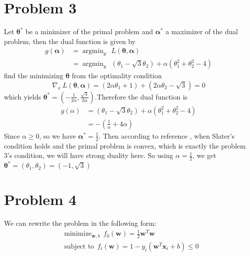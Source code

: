 \documentclass{article}
\begin{document}
\section*{Problem 3}
Let $\bm{\theta}^*$ be a minimizer of the primal problem and $\bm{\alpha}^*$ a maximizer of the dual problem, then the dual function is given by
\begin{equation}
	\begin{aligned}
		g(\bm{\alpha})
		&= \mathop{\arg\min}_{\theta}\ \ L(\bm{\theta}, \bm{\alpha})\\
		&= \mathop{\arg\min}_{\theta}\ \ (\theta_1 - \sqrt{3}\theta_2) + \alpha(\theta_1^2+\theta_2^2-4)	
	\end{aligned}
\end{equation}
find the minimizing $\bm{\theta}$ from the optimality condition
\begin{equation}
	\nabla_x\ L(\bm{\theta}, \bm{\alpha}) = (2\alpha\theta_1+1) + (2\alpha\theta_2 - \sqrt{3}) = 0
\end{equation}
which yields  $\bm{\theta}^*=(-\frac{1}{2\alpha}, \frac{\sqrt{3}}{2\alpha})$.Therefore the dual function is
\begin{equation}
	\begin{aligned}
		g(\alpha)
		&= (\theta_1 - \sqrt{3}\theta_2) + \alpha(\theta_1^2+\theta_2^2-4)\\
		&= -(\frac{1}{\alpha} + 4\alpha)
	\end{aligned}
\end{equation}
Since $\alpha \geq 0$, so we have $\bm{\alpha}^* = \frac{1}{2}$. Then according to reference \cite{Boyd:2004:CO:993483}, when Slater's condition holds and the primal problem is convex, which is exactly the problem 3's condition, we will have strong duality here. So using $\alpha = \frac{1}{2}$, we get $\bm{\theta}^* = (\theta_1, \theta_2) = (-1, \sqrt{3})$

\section*{Problem 4}
We can rewrite the problem in the following form:
\begin{equation}
	\begin{aligned}
		&\mathrm{minimize}_{\bm{w}, b}\ \ f_0(\bm{w}) = \frac{1}{2}\bm{w}^T\bm{w}\\
		&\text{subject to}\ \ f_i(\bm{w}) = 1 - y_i(\bm{w}^T\bm{x}_i + b) \leq 0
	\end{aligned}
\end{equation}
\end{document}
